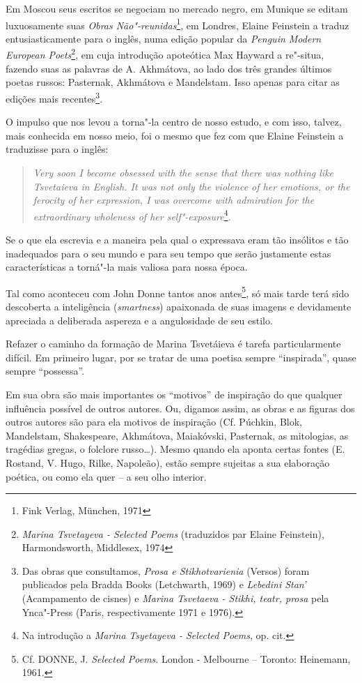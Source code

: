 Em Moscou seus escritos se negociam no mercado negro, em Munique se
editam luxuosamente suas \emph{Obras Não"-reunidas}\footnote{Fink Verlag,
  München, 1971}, em Londres, Elaine Feinstein a traduz
entusiasticamente para o inglês, numa edição popular da \emph{Penguin
Modern European Poets}\footnote{\emph{Marina Tsvetayeva - Selected
  Poems} (traduzidos par Elaine Feinstein), Harmondsworth, Middlesex,
  1974}, em cuja introdução apoteótica Max Hayward a re"-situa, fazendo
suas as palavras de A. Akhmátova, ao lado dos três grandes últimos
poetas russos: Pasternak, Akhmátova e Mandelstam. Isso apenas para citar
as edições mais recentes\footnote{Das obras que consultamos, \emph{Prosa
  e Stikhotvarienia} (Versos) foram publicados pela Bradda Books
  (Letchwarth, 1969) e \emph{Lebedini Stan'} (Acampamento de cisnes) e
  \emph{Marina Tsvetaeva - Stikhi, teatr, prosa} pela Ynca"-Press (Paris,
  respectivamente 1971 e 1976).}.

O impulso que nos levou a torna"-la centro de nosso estudo, e com isso,
talvez, mais conhecida em nosso meio, foi o mesmo que fez com que Elaine
Feinstein a traduzisse para o inglês:

\begin{quote}
\emph{Very soon I become obsessed with the sense that there was nothing
like Tsvetaieva in English. It was not only the violence of her
emotions, or the ferocity of her expression, I was overcome with
admiration for the extraordinary wholeness of her
self"-exposure}\footnote{Na introdução a \emph{Marina} \emph{Tsyetayeva -
  Selected Poems}, op. cit.}\emph{.}
\end{quote}

Se o que ela escrevia e a maneira pela qual o expressava eram tão
insólitos e tão inadequados para o seu mundo e para seu tempo que serão
justamente estas características a torná"-la mais valiosa para nossa
época.

Tal como aconteceu com John Donne tantos anos antes\footnote{Cf. DONNE,
  J. \emph{Selected Poems}. London - Melbourne -- Toronto: Heinemann,
  1961.}, só mais tarde terá sido descoberta a inteligência
(\emph{smartness}) apaixonada de suas imagens e devidamente apreciada a
deliberada aspereza e a angulosidade de seu estilo.

Refazer o caminho da formação de Marina Tsvetáieva é tarefa
particularmente difícil. Em primeiro lugar, por se tratar de uma poetisa
sempre ``inspirada'', quase sempre ``possessa''.

Em sua obra são mais importantes os ``motivos'' de inspiração do que
qualquer influência possível de outros autores. Ou, digamos assim, as
obras e as figuras dos outros autores são para ela motivos de inspiração
(Cf. Púchkin, Blok, Mandelstam, Shakespeare, Akhmátova, Maiakóvski,
Pasternak, as mitologias, as tragédias gregas, o folclore russo\ldots{}).
Mesmo quando ela aponta certas fontes (E. Rostand, V. Hugo, Rilke,
Napoleão), estão sempre sujeitas a sua elaboração poética, ou como ela
quer -- a seu olho interior.

